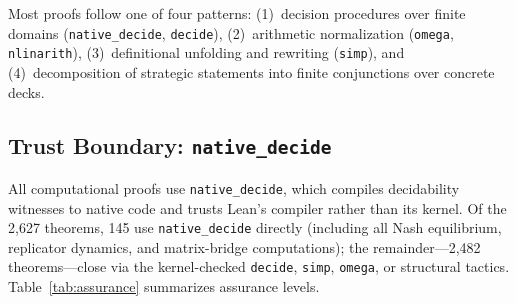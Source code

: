 \documentclass[journal]{IEEEtran}
\let\origsubsection\subsection
\renewcommand{\subsection}{\needspace{3\baselineskip}\origsubsection}
\begin{document}
Most proofs follow one of four patterns:
(1)~decision procedures over finite domains (\texttt{native\_decide}, \texttt{decide}),
(2)~arithmetic normalization (\texttt{omega}, \texttt{nlinarith}),
(3)~definitional unfolding and rewriting (\texttt{simp}), and
(4)~decomposition of strategic statements into finite conjunctions over concrete decks.

\subsection{Trust Boundary: \texttt{native\_decide}}\label{subsec:trust}

All computational proofs use \texttt{native\_decide}, which compiles decidability witnesses to native code and trusts Lean's compiler rather than its kernel.
Of the 2{,}627 theorems, 145 use \texttt{native\_decide} directly (including all Nash equilibrium, replicator dynamics, and matrix-bridge computations); the remainder---2{,}482 theorems---close via the kernel-checked \texttt{decide}, \texttt{simp}, \texttt{omega}, or structural tactics.
Table~\ref{tab:assurance} summarizes assurance levels.
\end{document}
